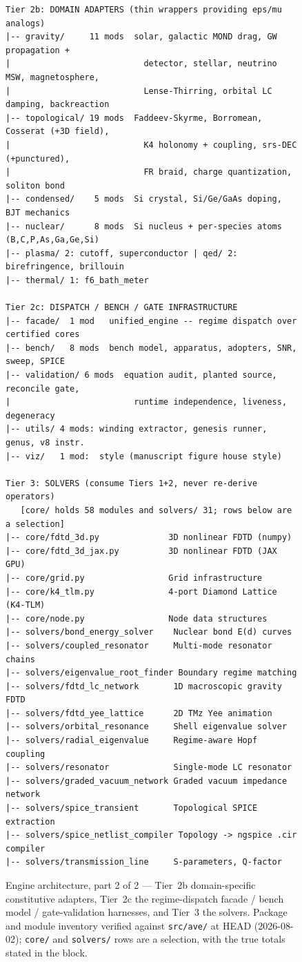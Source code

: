 \begin{figure}[H]
\centering
\begin{verbatim}
Tier 2b: DOMAIN ADAPTERS (thin wrappers providing eps/mu analogs)
|-- gravity/     11 mods  solar, galactic MOND drag, GW propagation +
|                           detector, stellar, neutrino MSW, magnetosphere,
|                           Lense-Thirring, orbital LC damping, backreaction
|-- topological/ 19 mods  Faddeev-Skyrme, Borromean, Cosserat (+3D field),
|                           K4 holonomy + coupling, srs-DEC (+punctured),
|                           FR braid, charge quantization, soliton bond
|-- condensed/    5 mods  Si crystal, Si/Ge/GaAs doping, BJT mechanics
|-- nuclear/      8 mods  Si nucleus + per-species atoms (B,C,P,As,Ga,Ge,Si)
|-- plasma/ 2: cutoff, superconductor | qed/ 2: birefringence, brillouin
|-- thermal/ 1: f6_bath_meter

Tier 2c: DISPATCH / BENCH / GATE INFRASTRUCTURE
|-- facade/  1 mod   unified_engine -- regime dispatch over certified cores
|-- bench/   8 mods  bench model, apparatus, adopters, SNR, sweep, SPICE
|-- validation/ 6 mods  equation audit, planted source, reconcile gate,
|                         runtime independence, liveness, degeneracy
|-- utils/ 4 mods: winding extractor, genesis runner, genus, v8 instr.
|-- viz/   1 mod:  style (manuscript figure house style)

Tier 3: SOLVERS (consume Tiers 1+2, never re-derive operators)
   [core/ holds 58 modules and solvers/ 31; rows below are a selection]
|-- core/fdtd_3d.py              3D nonlinear FDTD (numpy)
|-- core/fdtd_3d_jax.py          3D nonlinear FDTD (JAX GPU)
|-- core/grid.py                 Grid infrastructure
|-- core/k4_tlm.py               4-port Diamond Lattice (K4-TLM)
|-- core/node.py                 Node data structures
|-- solvers/bond_energy_solver    Nuclear bond E(d) curves
|-- solvers/coupled_resonator     Multi-mode resonator chains
|-- solvers/eigenvalue_root_finder Boundary regime matching
|-- solvers/fdtd_lc_network       1D macroscopic gravity FDTD
|-- solvers/fdtd_yee_lattice      2D TMz Yee animation
|-- solvers/orbital_resonance     Shell eigenvalue solver
|-- solvers/radial_eigenvalue     Regime-aware Hopf coupling
|-- solvers/resonator             Single-mode LC resonator
|-- solvers/graded_vacuum_network Graded vacuum impedance network
|-- solvers/spice_transient       Topological SPICE extraction
|-- solvers/spice_netlist_compiler Topology -> ngspice .cir compiler
|-- solvers/transmission_line     S-parameters, Q-factor
\end{verbatim}
\caption{Engine architecture, part 2 of 2 --- Tier~2b domain-specific
constitutive adapters, Tier~2c the regime-dispatch facade / bench model /
gate-validation harnesses, and Tier~3 the solvers.
Package and module inventory verified against \texttt{src/ave/} at HEAD
(2026-08-02); \texttt{core/} and \texttt{solvers/} rows are a selection,
with the true totals stated in the block.}
\label{fig:engine_tiers_part2}
\end{figure}



